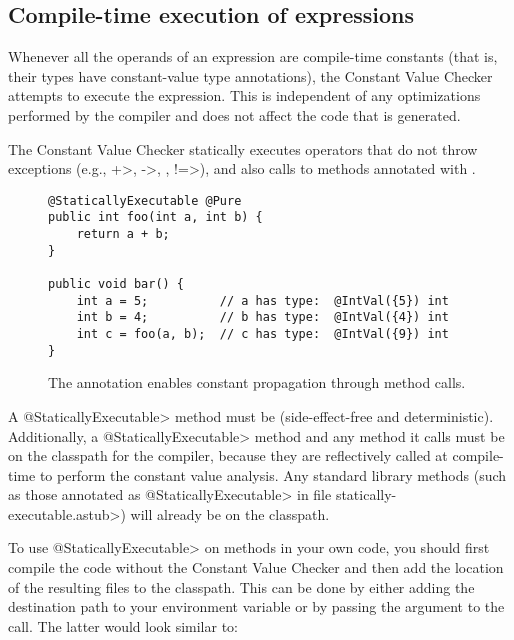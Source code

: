 \subsection{Compile-time execution of expressions\label{staticallyexecutable-annotation}}

Whenever all the operands of an expression are compile-time constants (that
is, their types have constant-value type annotations), the Constant Value
Checker attempts to execute the expression.  This is independent of any
optimizations performed by the compiler and does not affect the code that
is generated.

The Constant Value Checker statically executes operators that do
not throw exceptions (e.g., \<+>, \<->, \code{<\relax<}, \<!=>), and also
calls to methods annotated with
.

\begin{figure}
\begin{Verbatim}
@StaticallyExecutable @Pure
public int foo(int a, int b) {
    return a + b;
}

public void bar() {
    int a = 5;          // a has type:  @IntVal({5}) int
    int b = 4;          // b has type:  @IntVal({4}) int
    int c = foo(a, b);  // c has type:  @IntVal({9}) int
}
\end{Verbatim}
\caption{The
   annotation enables
  constant propagation through method calls.}
\label{fig-staticallyexecutable}
\end{figure}

\begin{sloppypar}
A \<@StaticallyExecutable> method must
be  (side-effect-free and
deterministic).
Additionally, a \<@StaticallyExecutable> method and any method it calls must be on
the classpath for the compiler, because they are reflectively called at
compile-time to perform the constant value analysis. Any standard
library methods (such as those annotated as \<@StaticallyExecutable> in file
\<statically-executable.astub>) will already be on the
classpath.
\end{sloppypar}

\begin{sloppypar}
To use \<@StaticallyExecutable> on methods in your own code, you should
first compile the code without the Constant Value Checker and then add
the location of the resulting  files to the
classpath. This can be done by either adding the destination path to
your environment variable  or by passing the
argument  to the call. The latter
would look similar to:
\end{sloppypar}



